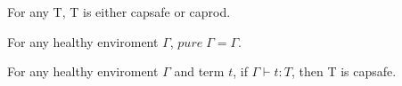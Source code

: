 \begin{lemma}
 For any T, T is either capsafe or caprod.
\end{lemma}

\begin{lemma}
  For any healthy enviroment $\Gamma$, $pure \; \Gamma = \Gamma$.
\end{lemma}


\begin{lemma}
 For any healthy enviroment $\Gamma$ and term $t$, if $\Gamma \vdash t
 : T$, then T is capsafe.
\end{lemma}



